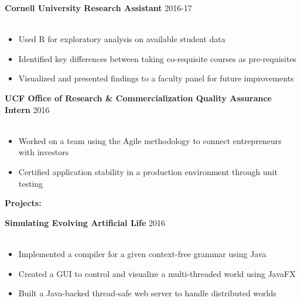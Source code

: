 \documentclass[12pt]{article}
\newcommand{\group}[1]{
	\fontsize{14}{0} \selectfont
	\textbf{#1}
}
\newcommand{\jobCaption}[2]{
	\hspace{0.3em}
	\fontsize{12}{13} \selectfont
	\textbf{#1}
	\fontsize{11}{12} \selectfont 
	\hfill{#2}\\[.1em]
}
\begin{document}
	
	\jobCaption{Cornell University Research Assistant}{2016-17}\\[-1.75em]
	\begin{itemize}[leftmargin=1.5cm]
		\setlength\itemsep{-.25em}
		\fontsize{11}{0} \selectfont 
	\item Used R for exploratory analysis on available student data
	\item Identified key differences between taking co-requisite courses as pre-requisites

\item Visualized and presented findings to a faculty panel for future improvements
	
	\end{itemize}
	
	\vspace{.7em}
\jobCaption{UCF Office of Research \& Commercialization Quality Assurance Intern}{2016}\\[-1.75em]
	\begin{itemize}[leftmargin=1.5cm]
		\setlength\itemsep{-.25em}
		\fontsize{11}{0} \selectfont 
	\item Worked on a team using the Agile methodology to connect entrepreneurs with investors
\item Certified application stability in a production environment through unit testing
	
	\end{itemize}

	\vspace{1em}

\group{Projects:}
	\vspace{.4em}

\jobCaption{Simulating Evolving Artificial Life}{2016}\\[-1.75em]
	\begin{itemize}[leftmargin=1.5cm]
		\setlength\itemsep{-.25em}
		\fontsize{11}{0} \selectfont 
		\item Implemented a compiler for a given context-free grammar using Java 
		\item Created a GUI to control and visualize a multi-threaded world using JavaFX
		\item Built a Java-backed thread-safe web server to handle distributed worlds
		
	\end{itemize}
	\vspace{.7em}
	
	\begin{comment}
	\jobCaption{Pawpulation}{2017}\\[-1.75em]
	\begin{itemize}[leftmargin=1.5cm]
		\setlength\itemsep{-.25em}
		\fontsize{11}{0} \selectfont 
		 
	\item Created a Java application for vets to access an online database of epidemiological data
\item Made the project distributed by creating a server and client for the application
	
	\end{itemize}
	\vspace{.7em}
	\end{comment}
	
\end{document}

